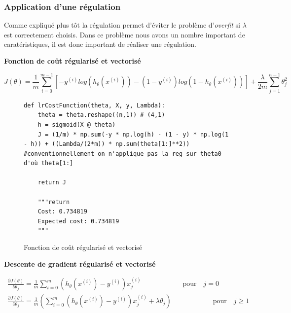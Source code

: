 \subsubsection{Application d'une régulation}

Comme expliqué plus tôt la régulation permet d'éviter le problème d'\textit{overfit} si $\lambda$ est correctement choisis. Dans ce problème nous avons un nombre important de caratéristiques, il est
donc important de réaliser une régulation.

\vspace{0.4cm}
\noindent
\textbf{Fonction de coût régularisé et vectorisé}

\begin{equation}\label{eq:cout-reg}
    J(\theta) = \frac{1}{m} \sum_{i=0}^{m-1}[-y^{(i)} log(h_\theta(x^{(i)})) - (1-y^{(i)}) log(1-h_\theta(x^{(i)}))] + \frac{\lambda}{2m} \sum_{j=1}^{n-1} \theta_j^2
\end{equation}

\begin{figure}[!h]
\begin{verbatim}
def lrCostFunction(theta, X, y, Lambda):
    theta = theta.reshape((n,1)) # (4,1)
    h = sigmoid(X @ theta)
    J = (1/m) * np.sum(-y * np.log(h) - (1 - y) * np.log(1 - h)) + ((Lambda/(2*m)) * np.sum(theta[1:]**2)) #conventionnellement on n'applique pas la reg sur theta0 d'où theta[1:]
        
    return J

    """return 
    Cost: 0.734819
    Expected cost: 0.734819
    """
\end{verbatim}   
\caption{Fonction de coût régularisé et vectorisé}
\end{figure}


\vspace{0.4cm}
\noindent
\textbf{Descente de gradient régularisé et vectorisé}

\begin{align}\label{eq:descente-gradient-reg}
    \frac{\partial J(\theta)}{\partial \theta_j} = \frac{1}{m} \sum_{i=0}^{m} (h_\theta(x^{(i)}) - y^{(i)}) x_j^{(i)} \qquad \qquad \qquad \text{pour} \quad j=0 \\
    \frac{\partial J(\theta)}{\partial \theta_j} = \frac{1}{m} \left( \sum_{i=0}^{m} (h_\theta(x^{(i)}) - y^{(i)}) x_j^{(i)} + \lambda \theta_j \right) \qquad \qquad \qquad \text{pour} \quad j\geq1 
\end{align}

